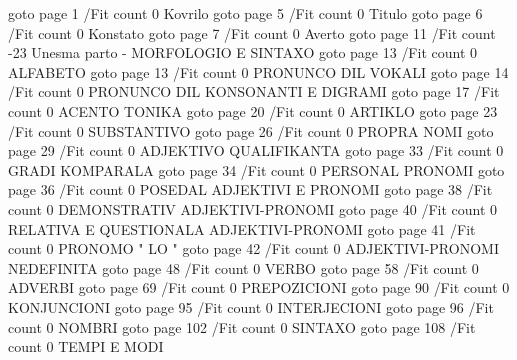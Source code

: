 \pdfoutline goto page 1 {/Fit} count 0 {Kovrilo}
\pdfoutline goto page 5 {/Fit} count 0 {Titulo}
\pdfoutline goto page 6 {/Fit} count 0 {Konstato}
\pdfoutline goto page 7 {/Fit} count 0 {Averto}
\pdfoutline goto page 11 {/Fit} count -23 {Unesma parto - MORFOLOGIO E SINTAXO}
  \pdfoutline goto page 13 {/Fit} count 0 {ALFABETO}
  \pdfoutline goto page 13 {/Fit} count 0 {PRONUNCO DIL VOKALI}
  \pdfoutline goto page 14 {/Fit} count 0 {PRONUNCO DIL KONSONANTI E DIGRAMI}
  \pdfoutline goto page 17 {/Fit} count 0 {ACENTO TONIKA}
  \pdfoutline goto page 20 {/Fit} count 0 {ARTIKLO}
  \pdfoutline goto page 23 {/Fit} count 0 {SUBSTANTIVO}
  \pdfoutline goto page 26 {/Fit} count 0 {PROPRA NOMI}
  \pdfoutline goto page 29 {/Fit} count 0 {ADJEKTIVO QUALIFIKANTA}
  \pdfoutline goto page 33 {/Fit} count 0 {GRADI KOMPARALA}
  \pdfoutline goto page 34 {/Fit} count 0 {PERSONAL PRONOMI}
  \pdfoutline goto page 36 {/Fit} count 0 {POSEDAL ADJEKTIVI E PRONOMI}
  \pdfoutline goto page 38 {/Fit} count 0 {DEMONSTRATIV ADJEKTIVI-PRONOMI}
  \pdfoutline goto page 40 {/Fit} count 0 {RELATIVA E QUESTIONALA ADJEKTIVI-PRONOMI}
  \pdfoutline goto page 41 {/Fit} count 0 {PRONOMO " LO "}
  \pdfoutline goto page 42 {/Fit} count 0 {ADJEKTIVI-PRONOMI NEDEFINITA}
  \pdfoutline goto page 48 {/Fit} count 0 {VERBO}
  \pdfoutline goto page 58 {/Fit} count 0 {ADVERBI}
  \pdfoutline goto page 69 {/Fit} count 0 {PREPOZICIONI}
  \pdfoutline goto page 90 {/Fit} count 0 {KONJUNCIONI}
  \pdfoutline goto page 95 {/Fit} count 0 {INTERJECIONI}
  \pdfoutline goto page 96 {/Fit} count 0 {NOMBRI}
  \pdfoutline goto page 102 {/Fit} count 0 {SINTAXO}
  \pdfoutline goto page 108 {/Fit} count 0 {TEMPI E MODI}
